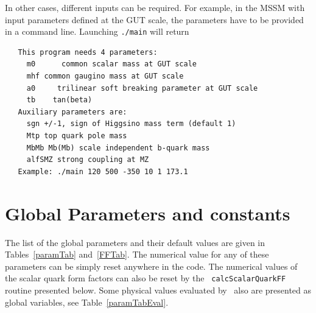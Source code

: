 \documentclass[12pt,a4paper]{article}
\begin{document}
In other cases, different inputs can be required. For example, in the MSSM with input parameters defined at the GUT scale,
the parameters have to be provided in a command line. Launching \verb|./main| will return 
\begin{verbatim}
   This program needs 4 parameters:
     m0      common scalar mass at GUT scale
     mhf common gaugino mass at GUT scale
     a0     trilinear soft breaking parameter at GUT scale
     tb    tan(beta)
   Auxiliary parameters are:
     sgn +/-1, sign of Higgsino mass term (default 1)
     Mtp top quark pole mass
     MbMb Mb(Mb) scale independent b-quark mass
     alfSMZ strong coupling at MZ
   Example: ./main 120 500 -350 10 1 173.1
\end{verbatim}



\section{Global Parameters and constants}
\label{sec:global_parameters}

The list of the global parameters  and their default values  are given  in Tables~\ref{paramTab} and~\ref{FFTab}. 
The numerical value for any of these parameters can be simply reset anywhere in the code. 
The numerical values of  the scalar quark form factors can also be reset by the {\tt
calcScalarQuarkFF} routine presented below. Some physical values  evaluated by \micro\  also are presented as global variables,  see Table~\ref{paramTabEval}. 
\end{document}

